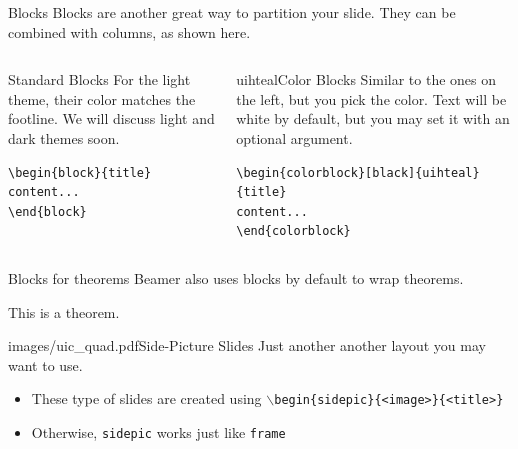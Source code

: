 \documentclass{beamer}
\begin{document}
\begin{frame}[fragile]{Blocks}
Blocks are another great way to partition your slide. They can be combined with columns, as shown here.
\begin{columns}
\begin{column}{0.3\textwidth}
\begin{block}{Standard Blocks}
For the light theme, their color matches the footline. We will discuss light and dark themes soon.
\begin{verbatim}
\begin{block}{title}
content...
\end{block}
\end{verbatim}
\end{block}
\end{column}
\begin{column}{0.7\textwidth}
\begin{colorblock}[black]{uihteal}{Color Blocks}
Similar to the ones on the left, but you pick the color. Text will be white by 
default, but you may set it with an optional argument.
\small
\begin{verbatim}
\begin{colorblock}[black]{uihteal}{title}
content...
\end{colorblock}
\end{verbatim}
\end{colorblock}
\end{column}
\end{columns}
\end{frame}


\begin{frame}[fragile]{Blocks for theorems}
Beamer also uses blocks by default to wrap theorems.
\begin{theorem} This is a theorem. \end{theorem}
\end{frame}


\begin{sidepic}{images/uic_quad.pdf}{Side-Picture Slides}
Just another another layout you may want to use.
\begin{itemize}
\item These type of slides are created using \texttt{$\backslash$begin\{sidepic\}\{<image>\}\{<title>\}}
\item Otherwise, \texttt{sidepic} works just like \texttt{frame}
\end{itemize}
\end{sidepic}


\renewcommand{\algorithmicrequire}{\textbf{Input:}}
\renewcommand{\algorithmicensure}{\textbf{Output:}}
\newcommand*\CALL[2]{\textsc{#1}(#2)}
\newcommand*\ANNOTATE[1]{\hfill\(\triangleright\) #1}%
\end{document}
